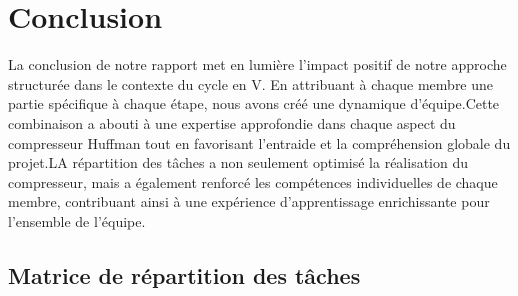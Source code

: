 \documentclass[12pt]{article}
\begin{document}
\section{Conclusion}
La conclusion de notre rapport met en lumière l'impact positif de notre approche structurée dans le contexte du cycle en V. En attribuant à chaque membre une partie spécifique à chaque étape, nous avons créé une dynamique d'équipe.Cette combinaison a abouti à une expertise approfondie dans chaque aspect du compresseur Huffman tout en favorisant l'entraide et la compréhension globale du projet.LA répartition des tâches  a non seulement optimisé la réalisation du compresseur, mais a également renforcé les compétences individuelles de chaque membre, contribuant ainsi à une expérience d'apprentissage enrichissante pour l'ensemble de l'équipe.
\newpage
\subsection{Matrice de répartition des tâches}
\end{document}
